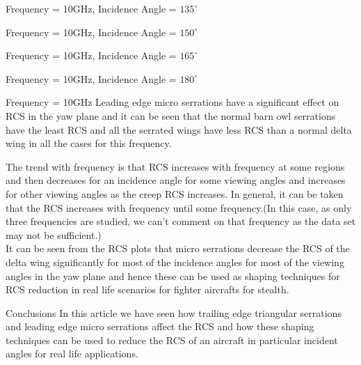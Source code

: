 \documentclass{beamer}
\begin{document}
\begin{frame}{Frequency = 10GHz, Incidence Angle = $135^\circ$}
	
\end{frame}

\begin{frame}{Frequency = 10GHz, Incidence Angle = $150^\circ$}
	
\end{frame}

\begin{frame}{Frequency = 10GHz, Incidence Angle = $165^\circ$}
	
\end{frame}

\begin{frame}{Frequency = 10GHz, Incidence Angle = $180^\circ$}
	
\end{frame}

\begin{frame}{Frequency = 10GHz}
\justifying
Leading edge micro serrations have a significant effect on RCS in the yaw plane and it can be seen that the normal barn owl serrations have the least RCS and all the serrated wings have less RCS than a normal delta wing in all the cases for this frequency.
\end{frame}

\begin{frame}
\justifying
The trend with frequency is that RCS increases with frequency at some regions and then decreases for an incidence angle for some viewing angles and increases for other viewing angles as the creep RCS increases. In general, it can be taken that the RCS increases with frequency until some frequency.(In this case, as only three frequencies are studied, we can't comment on that frequency as the data set may not be sufficient.) \\ 
It can be seen from the RCS plots that micro serrations decrease the RCS of the delta wing significantly for most of the incidence angles for most of the viewing angles in the yaw plane and hence these can be used as shaping techniques for RCS reduction in real life scenarios for fighter aircrafts for stealth.
\end{frame}

\begin{frame}{Conclusions}
In this article we have seen how trailing edge triangular serrations and leading edge micro serrations affect the RCS and how these shaping techniques can be used to reduce the RCS of an aircraft in particular incident angles for real life applications.
\end{frame}
\end{document}
